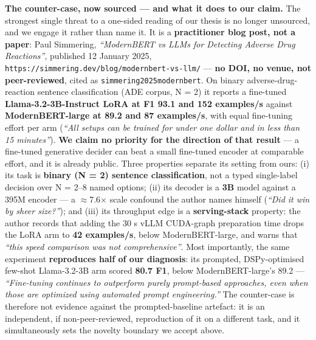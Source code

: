 \documentclass[10pt]{article}
\begin{document}
\textbf{The counter-case, now sourced --- and what it does to our claim.} The strongest single threat to a one-sided reading of our thesis is no longer unsourced, and we engage it rather than name it. It is a \textbf{practitioner blog post, not a paper}: Paul Simmering, \emph{``ModernBERT vs LLMs for Detecting Adverse Drug Reactions''}, published 12 January 2025, \texttt{https://simmering.dev/blog/modernbert-vs-llm/} --- \textbf{no DOI, no venue, not peer-reviewed}, cited as \texttt{simmering2025modernbert}\cite{simmering2025modernbert}. On binary adverse-drug-reaction sentence classification (ADE corpus, N = 2) it reports a fine-tuned \textbf{Llama-3.2-3B-Instruct LoRA at F1 93.1 and 152 examples/s} against \textbf{ModernBERT-large at 89.2 and 87 examples/s}, with equal fine-tuning effort per arm (\emph{``All setups can be trained for under one dollar and in less than 15 minutes''}). \textbf{We claim no priority for the direction of that result} --- a fine-tuned generative decider can beat a small fine-tuned encoder at comparable effort, and it is already public. Three properties separate its setting from ours: (i) its task is \textbf{binary (N = 2) sentence classification}, not a typed single-label decision over N = 2--8 named options; (ii) its decoder is a \textbf{3B} model against a 395M encoder --- a $\approx$7.6$\times$ scale confound the author names himself (\emph{``Did it win by sheer size?''}); and (iii) its throughput edge is a \textbf{serving-stack} property: the author records that adding the 30 s vLLM CUDA-graph preparation time drops the LoRA arm to \textbf{42 examples/s}, below ModernBERT-large, and warns that \emph{``this speed comparison was not comprehensive''}. Most importantly, the same experiment \textbf{reproduces half of our diagnosis}: its prompted, DSPy-optimised few-shot Llama-3.2-3B arm scored \textbf{80.7 F1}, below ModernBERT-large's 89.2 --- \emph{``Fine-tuning continues to outperform purely prompt-based approaches, even when those are optimized using automated prompt engineering.''} The counter-case is therefore not evidence against the prompted-baseline artefact: it is an independent, if non-peer-reviewed, reproduction of it on a different task, and it simultaneously sets the novelty boundary we accept above.
\end{document}
